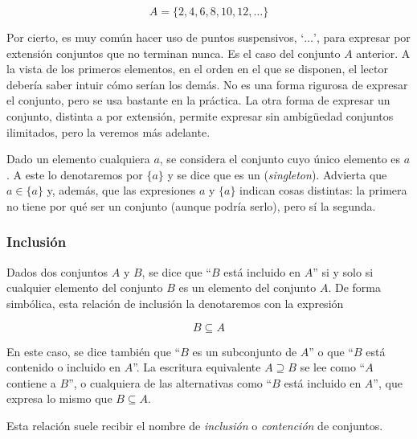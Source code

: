 
$$ A = \{2, 4, 6, 8, 10, 12, \dots\} $$

\noindent Por cierto, es muy común hacer uso de puntos
suspensivos\footnotemark, `$\dots$', para expresar por extensión conjuntos
que no terminan nunca. Es el caso del conjunto $A$ anterior. A la vista de
los primeros elementos, en el orden en el que se disponen, el lector debería
saber intuir cómo serían los demás. No es una forma rigurosa de expresar el
conjunto, pero se usa bastante en la práctica. La otra forma de expresar un
conjunto, distinta a por extensión, permite expresar sin ambigüedad
conjuntos ilimitados, pero la veremos más adelante.


Dado un elemento cualquiera $a$, se considera el conjunto cuyo único
elemento es $a$. A este lo denotaremos por $\{a\}$ y se dice que es un
 (\emph{singleton}). Advierta que $a \in \{a\}$ y,
además, que las expresiones $a$ y $\{a\}$ indican cosas distintas: la
primera no tiene por qué ser un conjunto (aunque podría serlo), pero sí la
segunda.





\subsubsection{Inclusión}

Dados dos conjuntos $A$ y $B$, se dice que ``$B$ está incluido en $A$'' si y
solo si cualquier elemento del conjunto $B$ es un elemento del conjunto $A$.
De forma simbólica, esta relación de inclusión la denotaremos con la
expresión

$$ B \subseteq A $$

\noindent En este caso, se dice también que ``$B$ es un subconjunto de $A$''
o que ``$B$ está contenido o incluido en $A$''. La escritura equivalente $A
\supseteq B$ se lee como ``$A$ contiene a $B$'', o cualquiera de las
alternativas como ``$B$ está incluido en $A$'', que expresa lo mismo que $B
\subseteq A$.

Esta relación suele recibir el nombre de \emph{inclusión} o
\emph{contención} de conjuntos.


